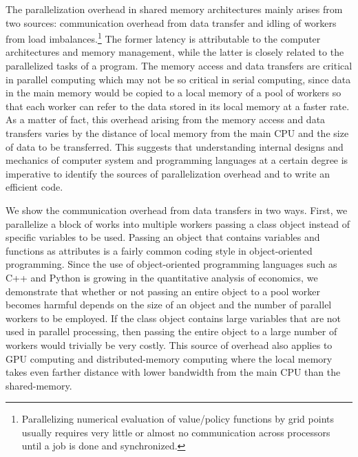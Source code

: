 \documentclass[12pt]{article}
\begin{document}
The parallelization overhead in shared memory architectures mainly arises from two sources: communication overhead from data transfer and idling of workers from load imbalances.\footnote{\sf Parallelizing numerical evaluation of value/policy functions by grid points usually requires very little or almost no communication across processors until a job is done and synchronized.} The former latency is attributable to the computer architectures and memory management, while the latter is closely related to the parallelized tasks of a program. The memory access and data transfers are critical in parallel computing which may not be so critical in serial computing, since data in the main memory would be copied to a local memory of a pool of workers so that each worker can refer to the data stored in its local memory at a faster rate. As a matter of fact, this overhead arising from the memory access and data transfers varies by the distance of local memory from the main CPU and the size of data to be transferred. This suggests that understanding internal designs and mechanics of computer system and programming languages at a certain degree is imperative to identify the sources of parallelization overhead and to write an efficient code.

We show the communication overhead from data transfers in two ways. First, we parallelize a block of works into multiple workers passing a class object instead of specific variables to be used. Passing an object that contains variables and functions as attributes is a fairly common coding style in object-oriented programming. Since the use of object-oriented programming languages such as C++ and Python is growing in the quantitative analysis of economics, we demonstrate that whether or not passing an entire object to a pool worker becomes harmful depends on the size of an object and the number of parallel workers to be employed. If the class object contains large variables that are not used in parallel processing, then passing the entire object to a large number of workers would trivially be very costly. This source of overhead also applies to GPU computing and distributed-memory computing where the local memory takes even farther distance with lower bandwidth from the main CPU than the shared-memory.
\end{document}
